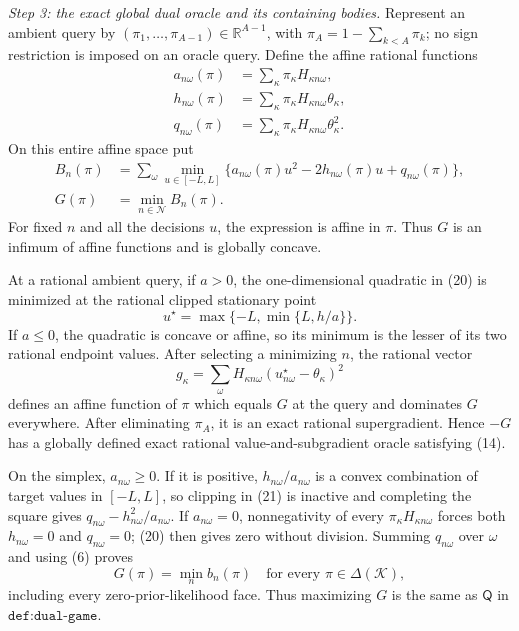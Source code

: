 \emph{Step 3: the exact global dual oracle and its containing bodies.}
Represent an ambient query by \((\pi_1,\ldots,\pi_{A-1})\in\mathbb R^{A-1}\), with \(\pi_A=1-\sum_{k<A}\pi_k\); no sign restriction is imposed on an oracle query.  Define the affine rational functions
\[
 \begin{split}
 a_{n\omega}(\pi)&=\sum_\kappa\pi_\kappa H_{\kappa n\omega},\\
 h_{n\omega}(\pi)&=\sum_\kappa\pi_\kappa H_{\kappa n\omega}\theta_\kappa,\\
 q_{n\omega}(\pi)&=\sum_\kappa\pi_\kappa H_{\kappa n\omega}\theta_\kappa^2.
 \end{split}
\tag{19}
\]
On this entire affine space put
\[
 \begin{split}
 B_n(\pi)&=\sum_\omega\min_{u\in[-L,L]}
 \{a_{n\omega}(\pi)u^2-2h_{n\omega}(\pi)u+q_{n\omega}(\pi)\},\\
 G(\pi)&=\min_{n\in\mathcal N}B_n(\pi).
 \end{split}
\tag{20}
\]
For fixed \(n\) and all the decisions \(u\), the expression is affine in \(\pi\).  Thus \(G\) is an infimum of affine functions and is globally concave.

At a rational ambient query, if \(a>0\), the one-dimensional quadratic in (20) is minimized at the rational clipped stationary point
\[
 u^\star=\max\{-L,\min\{L,h/a\}\}.
\tag{21}
\]
If \(a\le0\), the quadratic is concave or affine, so its minimum is the lesser of its two rational endpoint values.  After selecting a minimizing \(n\), the rational vector
\[
 g_\kappa=\sum_\omega H_{\kappa n\omega}
                 (u^\star_{n\omega}-\theta_\kappa)^2
\tag{22}
\]
defines an affine function of \(\pi\) which equals \(G\) at the query and dominates \(G\) everywhere.  After eliminating \(\pi_A\), it is an exact rational supergradient.  Hence \(-G\) has a globally defined exact rational value-and-subgradient oracle satisfying (14).

On the simplex, \(a_{n\omega}\ge0\).  If it is positive, \(h_{n\omega}/a_{n\omega}\) is a convex combination of target values in \([-L,L]\), so clipping in (21) is inactive and completing the square gives \(q_{n\omega}-h_{n\omega}^2/a_{n\omega}\).  If \(a_{n\omega}=0\), nonnegativity of every \(\pi_\kappa H_{\kappa n\omega}\) forces both \(h_{n\omega}=0\) and \(q_{n\omega}=0\); (20) then gives zero without division.  Summing \(q_{n\omega}\) over \(\omega\) and using (6) proves
\[
 G(\pi)=\min_n b_n(\pi)
 \quad\text{for every }\pi\in\Delta(\mathcal K),
\tag{23}
\]
including every zero-prior-likelihood face.  Thus maximizing \(G\) is the same as \(\mathsf Q\) in \(\texttt{def:dual-game}\).

